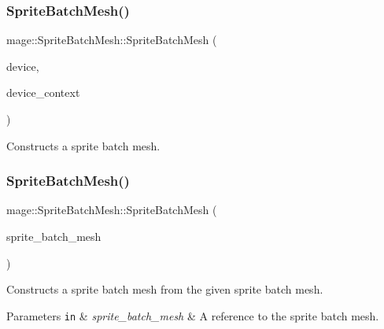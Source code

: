 \subsubsection{\texorpdfstring{Sprite\+Batch\+Mesh()}{SpriteBatchMesh()}\hspace{0.1cm}{\footnotesize\ttfamily [1/3]}}
{\footnotesize\ttfamily mage\+::\+Sprite\+Batch\+Mesh\+::\+Sprite\+Batch\+Mesh (\begin{DoxyParamCaption}\item[{I\+D3\+D11\+Device2 $\ast$}]{device,  }\item[{I\+D3\+D11\+Device\+Context2 $\ast$}]{device\+\_\+context }\end{DoxyParamCaption})\hspace{0.3cm}{\ttfamily [explicit]}}

Constructs a sprite batch mesh. \hypertarget{classmage_1_1_sprite_batch_mesh_af86adf72834bd4a8b5b55af3e91bd339}{}\label{classmage_1_1_sprite_batch_mesh_af86adf72834bd4a8b5b55af3e91bd339} 
\subsubsection{\texorpdfstring{Sprite\+Batch\+Mesh()}{SpriteBatchMesh()}\hspace{0.1cm}{\footnotesize\ttfamily [2/3]}}
{\footnotesize\ttfamily mage\+::\+Sprite\+Batch\+Mesh\+::\+Sprite\+Batch\+Mesh (\begin{DoxyParamCaption}\item[{const \hyperlink{classmage_1_1_sprite_batch_mesh}{Sprite\+Batch\+Mesh} \&}]{sprite\+\_\+batch\+\_\+mesh }\end{DoxyParamCaption})\hspace{0.3cm}{\ttfamily [delete]}}

Constructs a sprite batch mesh from the given sprite batch mesh.


\begin{DoxyParams}[1]{Parameters}
\mbox{\tt in}  & {\em sprite\+\_\+batch\+\_\+mesh} & A reference to the sprite batch mesh. \\
\hline
\end{DoxyParams}
\hypertarget{classmage_1_1_sprite_batch_mesh_abbf8c76740e0f04eaabe5fe0790fe72c}{}\label{classmage_1_1_sprite_batch_mesh_abbf8c76740e0f04eaabe5fe0790fe72c} 
